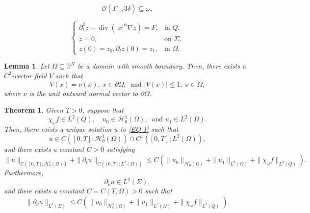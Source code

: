 \documentclass[10pt,a4paper]{amsart}
\newtheorem{theorem}{Theorem}
\newtheorem{lemma}{Lemma}
\DeclareMathOperator{\Div}{div}
\def\Ga{\Gamma}
\def\Om{\Omega}
\newcommand{\R}{\mathbb R}
\def\al{\alpha}
\def\de{\delta}
\def\mcH{\mathcal{H}}
\def\mcO{\mathcal{O}}
\def\ol{\overline}
\def\om{\omega}
\def\pt{\partial}
\def\s{\subseteq}
\begin{document}
		\begin{equation}\label{2-6}
			\mcO(\Ga_+, 3\de)\s \om,
		\end{equation}

		\begin{equation}\label{EQ-2}
			\begin{cases}
				\pt_t^2z-\Div(|x|^\al \nabla z)=F, &\mbox{in } Q,\\
				z=0, &\mbox{on }\Sigma,\\
				z(0)=z_0, \pt_tz(0)=z_1, &\mbox{in }\Om,
			\end{cases}
		\end{equation}

		\begin{lemma}\label{L2.3}
			Let $\Om\s \R^N$ be a domain with smooth boundary. Then, there exists a $C^2$-vector field $V$ such that
			\begin{equation*}
				V(x)=\nu(x), \ x\in \pt\Om, \ \mbox{ and } |V(x)|\leq 1, \ x\in \ol{\Om},
			\end{equation*}
			where $\nu$   is the unit outward normal vector to $\pt\Om$.
		\end{lemma}

		\begin{theorem}\label{T2.2}
			Given $T>0$, suppose that
			\begin{equation*}
				\chi_\omega f\in L^2(Q), \quad u_0\in \mcH_0^1(\Om), \ \mbox{ and } u_1\in L^2(\Om).
			\end{equation*}
			Then, there exists a unique solution $u$ to  \eqref{EQ-1} such that
			\begin{equation*}
				u\in C([0,T]; \mcH_0^1(\Om))\cap C^1([0,T]; L^2(\Om)),
			\end{equation*}
			and there exists a constant $C>0$ satisfying
			\begin{equation}\label{10.02.1}
				\|u\|_{C([0,T]; \mcH_0^1(\Om))}+\|\pt_tu\|_{C([0,T]; L^2(\Om))}\leq C\left(\|u_0\|_{\mcH_0^1(\Om)}+\|u_1\|_{L^2(\Om)}+\|\chi_\omega f\|_{L^2(Q)}\right).
			\end{equation}
			Furthermore,
			\begin{equation*}
				\pt_\nu u\in L^2(\Sigma),
			\end{equation*}
			and there exists a constant $C=C(T, \Om)>0$ such that
			\begin{equation}\label{10.02.4}
				\|\pt_\nu u\|_{L^2(\Sigma)}\leq C\left(\|u_0\|_{\mcH_0^1(\Om)}+\|u_1\|_{L^2(\Om)}+\|\chi_\omega f\|_{L^2(Q)}\right).
			\end{equation}
		\end{theorem}
\end{document}

